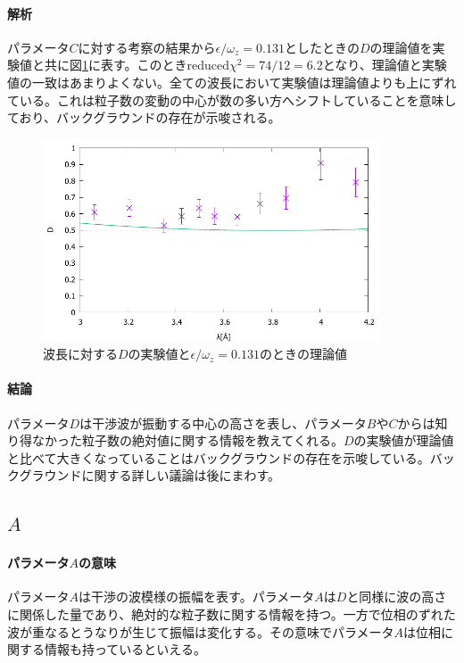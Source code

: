 \paragraph{解析}
パラメータ$C$に対する考察の結果から$\epsilon/\omega_z=0.131$としたときの$D$の理論値を実験値と共に図\ref{analysis_fig_D_N1}に表す。このときreduced$\chi^2=74/12=6.2$となり、理論値と実験値の一致はあまりよくない。全ての波長において実験値は理論値よりも上にずれている。これは粒子数の変動の中心が数の多い方へシフトしていることを意味しており、バックグラウンドの存在が示唆される。
\begin{figure}[h]
\centering
\includegraphics[width=10cm]{analysis/D/D_F_N1.pdf}
\caption{波長に対する$D$の実験値と$\epsilon/\omega_z=0.131$のときの理論値}\label{analysis_fig_D_N1}
\end{figure}

\paragraph{結論}
パラメータ$D$は干渉波が振動する中心の高さを表し、パラメータ$B$や$C$からは知り得なかった粒子数の絶対値に関する情報を教えてくれる。$D$の実験値が理論値と比べて大きくなっていることはバックグラウンドの存在を示唆している。バックグラウンドに関する詳しい議論は後にまわす。

\subsection{$A$}
\paragraph{パラメータ$A$の意味}
パラメータ$A$は干渉の波模様の振幅を表す。パラメータ$A$は$D$と同様に波の高さに関係した量であり、絶対的な粒子数に関する情報を持つ。一方で位相のずれた波が重なるとうなりが生じて振幅は変化する。その意味でパラメータ$A$は位相に関する情報も持っているといえる。

